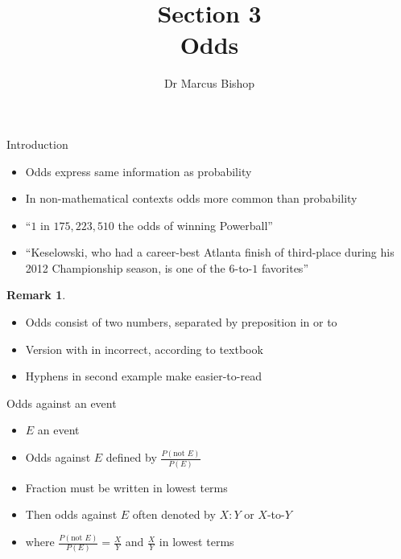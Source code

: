 \documentclass{beamer}
\title[\S3]{Section 3\\Odds}
\author{Dr Marcus Bishop}
\theoremstyle{definition}
\newtheorem{remark}{Remark}
\begin{document}
\begin{frame}\titlepage\end{frame}
\LogoOff

\begin{frame}{Introduction}
\begin{itemize}
\item \alert{Odds} express same information as probability
\item In non-mathematical contexts
odds more common than probability
\end{itemize}
\begin{example}
\begin{itemize}
\item ``\alert{$1$ in $175,223,510$} the odds of winning Powerball''
\item ``Keselowski, who had a career-best Atlanta finish of third-place
during his 2012 Championship season, is one of the \alert{$6$-to-$1$} favorites''
\end{itemize}
\end{example}
\begin{remark}
\begin{itemize}
\item Odds consist of two numbers, separated by preposition \alert{in} or \alert{to}
\item Version with \alert{in} incorrect, according to textbook
\item Hyphens in second example make \alert{easier-to-read}
\end{itemize}
\end{remark}
\end{frame}

\begin{frame}{Odds against an event}
\begin{definition}
\begin{itemize}
\item $E$ an event
\item \alert{Odds against $E$} defined by
$\frac{P\left(\text{not $E$}\right)}{P\left(E\right)}$
\item Fraction must be written in \alert{lowest terms}
\item Then odds against $E$ often denoted by \alert{$X:Y$} or \alert{$X$-to-$Y$}
\item[]where $\frac{P\left(\text{not $E$}\right)}{P\left(E\right)}
=\frac{X}{Y}$ and $\frac{X}{Y}$ in lowest terms
\end{itemize}
\end{definition}
\end{frame}
\end{document}
